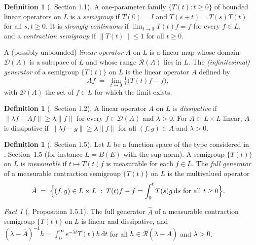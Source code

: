 \documentclass[11pt,a4paper]{article}
\theoremstyle{plain}
\theoremstyle{definition}
\newtheorem{definition}[theorem]{Definition}
\theoremstyle{remark}
\newtheorem{fact}[theorem]{Fact}
\newcommand{\Bdd}{B}                           %
\newcommand{\dom}{\mathcal{D}}                 %
\newcommand{\ran}{\mathcal{R}}                 %
\newcommand{\dif}{\,\mathrm{d}}
\newcommand{\Lsp}{L}                           %
\newcommand{\EK}{\cite{EK86}}
\begin{document}
\begin{definition}[\EK, Section 1.1]
  \label{def:semigroup}
  A one-parameter family $\{T(t) : t \geq 0\}$ of bounded linear operators on
  $\Lsp$ is a \emph{semigroup} if $T(0) = I$ and $T(s+t) = T(s)T(t)$ for all
  $s,t \geq 0$.  It is \emph{strongly continuous} if
  $\lim_{t \to 0} T(t) f = f$ for every $f \in \Lsp$, and a \emph{contraction
  semigroup} if $\lVert T(t) \rVert \leq 1$ for all $t \geq 0$.

  A (possibly unbounded) \emph{linear operator} $A$ on $\Lsp$ is a linear map
  whose domain $\dom(A)$ is a subspace of $\Lsp$ and whose range $\ran(A)$ lies
  in $\Lsp$.  The \emph{(infinitesimal) generator} of a semigroup $\{T(t)\}$ on
  $\Lsp$ is the linear operator $A$ defined by
  \begin{equation}
    \label{eq:generator}
    Af \;=\; \lim_{t \to 0} \tfrac{1}{t} \bigl( T(t) f - f \bigr) ,
  \end{equation}
  with $\dom(A)$ the set of $f \in \Lsp$ for which the limit exists.
\end{definition}

\begin{definition}[\EK, Section 1.2]
  \label{def:dissipative}
  A linear operator $A$ on $\Lsp$ is \emph{dissipative} if
  $\lVert \lambda f - A f \rVert \geq \lambda \lVert f \rVert$ for every
  $f \in \dom(A)$ and $\lambda > 0$.  For $A \subset \Lsp \times \Lsp$ linear,
  $A$ is dissipative if $\lVert \lambda f - g \rVert \geq \lambda \lVert f\rVert$
  for all $(f,g) \in A$ and $\lambda > 0$.
\end{definition}

\begin{definition}[\EK, Section 1.5]
  \label{def:fullgenerator}
  Let $\Lsp$ be a function space of the type considered in \EK, Section~1.5 (for
  instance $\Lsp = \Bdd(E)$ with the sup norm).  A semigroup $\{T(t)\}$ on
  $\Lsp$ is \emph{measurable} if $t \mapsto T(t) f$ is measurable for each
  $f \in \Lsp$.  The \emph{full generator} of a measurable contraction semigroup
  $\{T(t)\}$ on $\Lsp$ is the multivalued operator
  \begin{equation}
    \label{eq:fullgenerator}
    \hat{A} \;=\; \Bigl\{ (f,g) \in \Lsp \times \Lsp \;:\;
      T(t) f - f = \int_0^t T(s) g \dif s \text{ for all } t \geq 0 \Bigr\} .
  \end{equation}
\end{definition}

\begin{fact}[\EK, Proposition 1.5.1]
  \label{fact:fullgenerator}
  The full generator $\hat{A}$ of a measurable contraction semigroup
  $\{T(t)\}$ on $\Lsp$ is linear and dissipative, and
  $(\lambda - \hat{A})^{-1} h = \int_0^\infty e^{-\lambda t} T(t) h \dif t$ for
  all $h \in \ran(\lambda - \hat{A})$ and $\lambda > 0$.
\end{fact}
\end{document}
